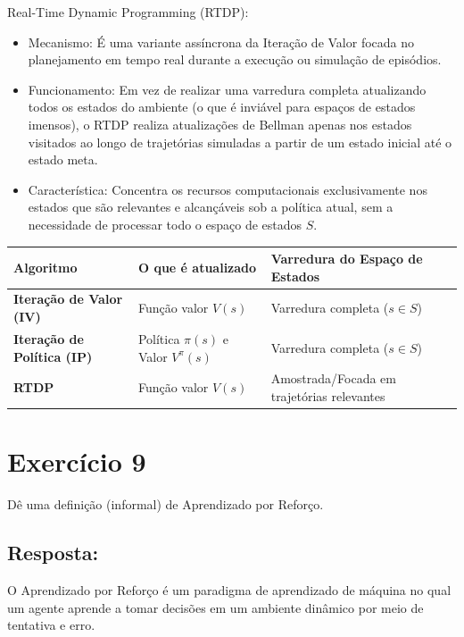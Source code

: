 \documentclass[a4paper,12pt]{article}
\begin{document}
Real-Time Dynamic Programming (RTDP):\\
\begin{itemize}
	\item Mecanismo: É uma variante assíncrona da Iteração de Valor focada no planejamento em tempo real durante a execução ou simulação de episódios.
	\item Funcionamento: Em vez de realizar uma varredura completa atualizando todos os estados do ambiente (o que é inviável para espaços de estados imensos), o RTDP realiza atualizações de Bellman apenas nos estados visitados ao longo de trajetórias simuladas a partir de um estado inicial até o estado meta.
	\item Característica: Concentra os recursos computacionais exclusivamente nos estados que são relevantes e alcançáveis sob a política atual, sem a necessidade de processar todo o espaço de estados $S$.
\end{itemize}



\begin{table}[h!]
	\centering
	\begin{tabular}{|l|p{4cm}|p{4.5cm}|}
		\hline
		\textbf{Algoritmo} & \textbf{O que é atualizado} & \textbf{Varredura do Espaço de Estados} \\ \hline
		\textbf{Iteração de Valor (IV)} & Função valor $V(s)$ & Varredura completa ($s \in S$) \\ \hline
		\textbf{Iteração de Política (IP)} & Política $\pi(s)$ e Valor $V^\pi(s)$ & Varredura completa ($s \in S$) \\ \hline
		\textbf{RTDP} & Função valor $V(s)$ & Amostrada/Focada em trajetórias relevantes \\ \hline
	\end{tabular}
\end{table}

\section*{Exercício 9}

Dê uma definição (informal) de Aprendizado por Reforço.


\subsection*{Resposta:}

\bigskip

O Aprendizado por Reforço é um paradigma de aprendizado de máquina no qual um agente aprende a tomar decisões em um ambiente dinâmico por meio de tentativa e erro. \\
\end{document}
